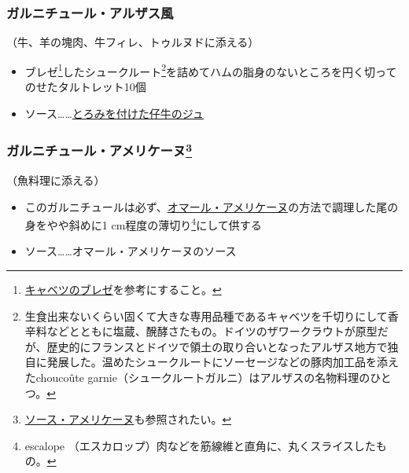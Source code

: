 \begin{recette}
{\subsubsection{ガルニチュール・アルザス風}\label{garniture-alsacienne}}



（牛、羊の塊肉、牛フィレ、トゥルヌドに添える）

\begin{itemize}
\item
  ブレゼ\footnote{\protect\hyperlink{chou-braise}{キャベツのブレゼ}を参考にすること。}したシュークルート\footnote{生食出来ないくらい固くて大きな専用品種であるキャベツを千切りにして香辛料などとともに塩蔵、醗酵さたもの。ドイツのザワークラウトが原型だが、歴史的にフランスとドイツで領土の取り合いとなったアルザス地方で独自に発展した。温めたシュークルートにソーセージなどの豚肉加工品を添えたchoucoûte
    garnie（シュークルートガルニ）はアルザスの名物料理のひとつ。}を詰めてハムの脂身のないところを円く切ってのせたタルトレット10個
\item
  ソース\ldots{}\ldots{}\protect\hyperlink{jus-de-veau-lie}{とろみを付けた仔牛のジュ}
\end{itemize}

\hypertarget{garniture-americaine}{%
\subsubsection[ガルニチュール・アメリケーヌ]{\texorpdfstring{ガルニチュール・アメリケーヌ\footnote{\protect\hyperlink{sauce-americaine}{ソース・アメリケーヌ}も参照されたい。}}{ガルニチュール・アメリケーヌ}}\label{garniture-americaine}}



（魚料理に添える）

\begin{itemize}
\item
  このガルニチュールは必ず、\protect\hyperlink{homard-americaine}{オマール・アメリケーヌ}の方法で調理した尾の身をやや斜めに1
  cm程度の薄切り\footnote{escalope
    （エスカロップ）肉などを筋線維と直角に、丸くスライスしたもの。}にして供する
\item
  ソース\ldots{}\ldots{}オマール・アメリケーヌのソース
\end{itemize}


\end{recette}
